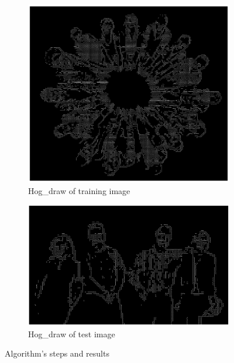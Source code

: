 \documentclass{article}
\newcommand{\tl}[1]{\textlatin{#1}}
\begin{document}
\begin{figure}[H]
		\begin{subfigure}[b]{0.5\textwidth}
			\includegraphics[width=\textwidth]{res/hogdraw_train.eps}
			\caption{\tl{Hog\_draw of training image}}		
		\end{subfigure}%
		\begin{subfigure}[b]{0.5\textwidth}
			\includegraphics[width=\textwidth]{res/hogdraw_test.eps}
			\caption{\tl{Hog\_draw of test image}}	
		\end{subfigure}%
		\caption{\tl{Algorithm's steps and results}}
		\label{fig:2}
	\end{figure}
\end{document}

